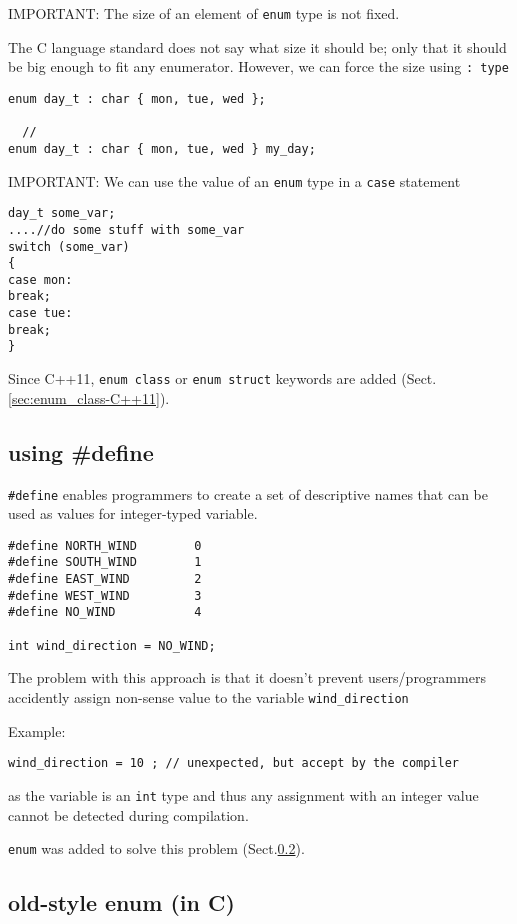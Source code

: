 IMPORTANT: The size of an element of \verb!enum! type is not fixed. 

The C language standard does not say what size it should be; only that it should
be big enough to fit any enumerator. However, we can force the size using \verb!: type!
\begin{verbatim}
enum day_t : char { mon, tue, wed };

  // 
enum day_t : char { mon, tue, wed } my_day;
\end{verbatim}

IMPORTANT: We can use the value of an \verb!enum! type in a \verb!case! statement
\begin{verbatim}
day_t some_var;
....//do some stuff with some_var
switch (some_var)
{
case mon:
break;
case tue:
break;
}
\end{verbatim}


Since C++11, \verb!enum class! or \verb!enum struct! keywords are added 
(Sect.\ref{sec:enum_class-C++11}).


\subsection{using \#define}
\label{sec:macro-define}

\verb!#define! enables programmers to create a set of descriptive
names that can be used as values for integer-typed variable.

\begin{verbatim}
#define NORTH_WIND        0
#define SOUTH_WIND        1
#define EAST_WIND         2
#define WEST_WIND         3     
#define NO_WIND           4       

int wind_direction = NO_WIND;
\end{verbatim}

The problem with this approach is that it doesn't prevent users/programmers
accidently assign non-sense value to the variable \verb!wind_direction! 

Example:
\begin{verbatim}
wind_direction = 10 ; // unexpected, but accept by the compiler
\end{verbatim}
as the variable is an \verb!int! type and thus any assignment with an integer
value cannot be detected during compilation. 

\verb!enum! was added to solve this problem (Sect.\ref{sec:enum-C}).

\subsection{old-style enum (in C)}
\label{sec:enum-C}

